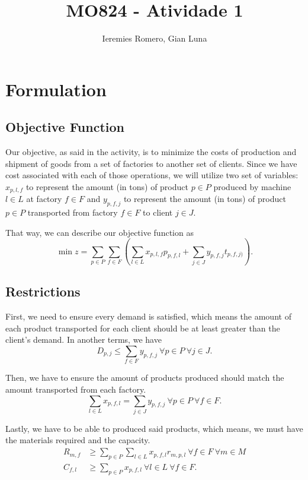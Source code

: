 \documentclass[11pt]{article}
\author{Ieremies Romero, Gian Luna}
\date{}
\title{MO824 - Atividade 1}
\theoremstyle{definition}
\theoremstyle{definition}
\theoremstyle{remark}
\theoremstyle{remark}
\theoremstyle{remark}
\theoremstyle{remark}
\theoremstyle{definition}
\begin{document}
\maketitle

\section*{Formulation}
\label{sec:orga106d7c}
\subsection*{Objective Function}
\label{sec:org5ed020e}
Our objective, as said in the activity, is to minimize the costs of production and shipment of goods from a set of factories to another set of clients. Since we have cost associated with each of those operations, we will utilize two set of variables: \(x_{p,l,f}\) to represent the amount (in tons) of product \(p \in P\) produced by machine \(l \in L\) at factory \(f \in F\) and \(y_{p, f, j}\) to represent the amount (in tons) of product \(p \in P\) transported from factory \(f \in F\) to client \(j \in J\).

That way, we can describe our objective function as
\[ \min z = \sum \limits_{p \in P} \sum_{f \in F} (\sum \limits_{l \in L} x_{p,l,f}p_{p,f,l} + \sum_{j \in J} y_{p,f,j}t_{p,f,j)}). \]
\subsection*{Restrictions}
\label{sec:org72c21d0}
First, we need to ensure every demand is satisfied, which means the amount of each product transported for each client should be at least greater than the client's demand. In another terms, we have
\[ D_{p,j} \leq \sum_{f \in F} y_{p,f,j} \ \forall p \in P \ \forall j \in J. \]

Then, we have to ensure the amount of products produced should match the amount transported from each factory.
\[ \sum \limits_{l \in L} x_{p,f,l} = \sum_{j \in J} y_{p,f,j} \ \forall p \in P \ \forall f \in F . \]

Lastly, we have to be able to produced said products, which means, we must have the materials required and the capacity.
\begin{align*}
R_{m,f} &\geq \sum \limits_{p \in P} \sum \limits_{l \in L} x_{p,f,l}r_{m,p,l} \ \forall f \in F \ \forall m \in M \\
C_{f,l} &\geq \sum_{p \in P} x_{p,f,l} \ \forall l \in L \ \forall f \in F.
\end{align*}
\end{document}
